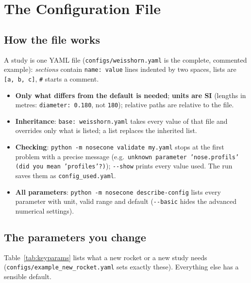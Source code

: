 \section{The Configuration File}
\label{sec:parameters}

\subsection{How the file works}

A study is one YAML file (\texttt{configs/weisshorn.yaml} is the complete, commented example): \emph{sections}
contain \texttt{name: value} lines indented by two spaces, lists are \texttt{[a, b, c]}, \texttt{\#} starts a comment.
\begin{itemize}[leftmargin=*,itemsep=1pt]
\item \textbf{Only what differs from the default is needed}; \textbf{units are SI} (lengths in metres:
\texttt{diameter: 0.180}, not \texttt{180}); relative paths are relative to the file.
\item \textbf{Inheritance}: \texttt{base: weisshorn.yaml} takes every value of that file and overrides only what is
listed; a list replaces the inherited list.
\item \textbf{Checking}: \texttt{python -m nosecone validate my.yaml} stops at the first problem with a precise
message (e.g.\ \texttt{unknown parameter 'nose.profils' (did you mean 'profiles'?)}); \texttt{-{}-show} prints every
value used. The run saves them as \texttt{config\_used.yaml}.
\item \textbf{All parameters}: \texttt{python -m nosecone describe-config} lists every parameter with unit, valid
range and default (\texttt{-{}-basic} hides the advanced numerical settings).
\end{itemize}

\subsection{The parameters you change}
\label{sec:paramtables}

Table~\ref{tab:keyparams} lists what a new rocket or a new study needs (\texttt{configs/example\_new\_rocket.yaml}
sets exactly these). Everything else has a sensible default.

